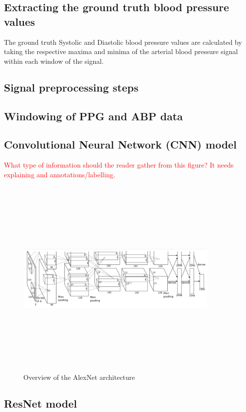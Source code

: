 \subsection{Extracting the ground truth blood pressure values}
The ground truth Systolic and Diastolic blood pressure values are calculated by taking the respective 
maxima and minima of the arterial blood pressure signal within each window of the signal.




\subsection{Signal preprocessing steps}


\subsection{Windowing of PPG and ABP data}

\subsection{Convolutional Neural Network (CNN) model}

\textcolor{red}{What type of information should the reader gather from this figure? It needs explaining and annotations/labelling.}

\begin{figure}[H]
    \centering
    \includegraphics[width=10cm,height=10cm,keepaspectratio]{Implementation/alexnetArch.png}
    \caption{Overview of the AlexNet architecture}
    \label{alexnetArch}
\end{figure}



\subsection{ResNet model}


